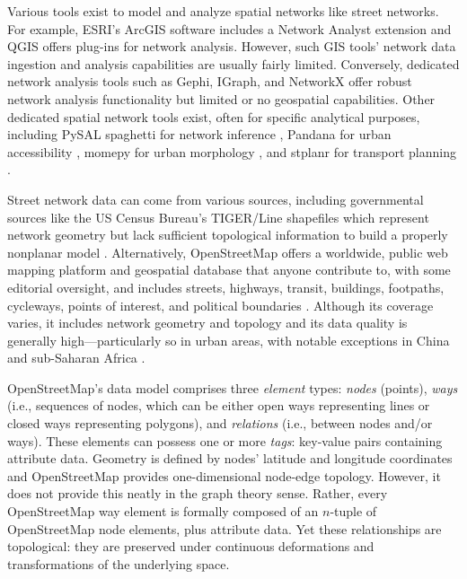 \documentclass[12pt,letterpaper]{article} %
\begin{document}
Various tools exist to model and analyze spatial networks like street networks. For example, ESRI's ArcGIS software includes a Network Analyst extension and QGIS offers plug-ins for network analysis. However, such GIS tools' network data ingestion and analysis capabilities are usually fairly limited. Conversely, dedicated network analysis tools such as Gephi, IGraph, and NetworkX offer robust network analysis functionality but limited or no geospatial capabilities. Other dedicated spatial network tools exist, often for specific analytical purposes, including PySAL spaghetti for network inference \citep{gaboardi_spaghetti_2021,rey_pysal_2022}, Pandana for urban accessibility \citep{foti_behavioral_2014}, momepy for urban morphology \citep{fleischmann_momepy_2019}, and stplanr for transport planning \citep{lovelace_stplanr_2019}.

Street network data can come from various sources, including governmental sources like the US Census Bureau's TIGER/Line shapefiles which represent network geometry but lack sufficient topological information to build a properly nonplanar model \citep{boeing_graph_2024}. Alternatively, OpenStreetMap offers a worldwide, public web mapping platform and geospatial database that anyone contribute to, with some editorial oversight, and includes streets, highways, transit, buildings, footpaths, cycleways, points of interest, and political boundaries \citep{jokar_arsanjani_openstreetmap_2015}. Although its coverage varies, it includes network geometry and topology and its data quality is generally high---particularly so in urban areas, with notable exceptions in China and sub-Saharan Africa \citep{barron_comprehensive_2014,barrington-leigh_worlds_2017}.

OpenStreetMap's data model comprises three \textit{element} types: \textit{nodes} (points), \textit{ways} (i.e., sequences of nodes, which can be either open ways representing lines or closed ways representing polygons), and \textit{relations} (i.e., between nodes and/or ways). These elements can possess one or more \textit{tags}: key-value pairs containing attribute data. Geometry is defined by nodes' latitude and longitude coordinates and OpenStreetMap provides one-dimensional node-edge topology. However, it does not provide this neatly in the graph theory sense. Rather, every OpenStreetMap way element is formally composed of an $n$-tuple of OpenStreetMap node elements, plus attribute data. Yet these relationships are topological: they are preserved under continuous deformations and transformations of the underlying space.
\end{document}

